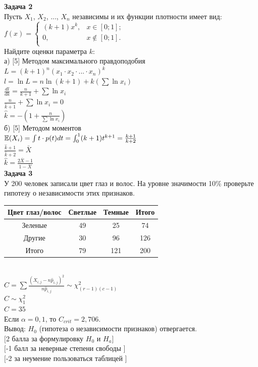 \documentclass[12pt, a4paper]{article}\usepackage[]{graphicx}\usepackage[]{color}
\begin{document}
{\bf Задача 2} \\
Пусть $X_{1}$, $X_{2}$, ..., $X_{n}$ независимы и их функции
плотности имеет вид: \\
$ f(x)=
\left\{%
\begin{array}{ll}
    (k+1)x^{k}, & x \in [0;1]; \\
    0, & x \notin [0;1]. \\
\end{array}%
\right.     $ \\
Найдите оценки параметра $k$: \\
а) [5] Методом максимального правдоподобия \\
$L=(k+1)^{n}(x_{1}\cdot x_{2} \cdot...\cdot x_{n})^{k}$ \\
$l=\ln{L}=n\ln(k+1)+k(\sum \ln{x_{i}})$ \\
$\frac{dl}{dk}=\frac{n}{k+1}+\sum \ln{x_{i}}$ \\
$\frac{n}{\hat{k}+1}+\sum \ln{x_{i}}=0$ \\
$\hat{k}=-\left(1+\frac{n}{\sum \ln{x_{i}}} \right)$ \\
б) [5] Методом моментов \\
$\mathbb{E}(X_{i})=\int t\cdot p(t)dt=\int_{0}^{1}
(k+1)t^{k+1}=\frac{k+1}{k+2}$ \\
$\frac{\hat{k}+1}{\hat{k}+2}=\bar{X}$ \\
$\hat{k}=\frac{2\bar{X}-1}{1-\bar{X}}$ \\


{\bf Задача 3} \\
У 200 человек записали цвет глаз и волос. На уровне значимости
10\% проверьте гипотезу о независимости этих признаков. \\
\begin{tabular}{|c|c|c|c|}
  \hline
  Цвет глаз/волос & Светлые & Темные & Итого \\
  \hline
  Зеленые & 49 & 25 & 74 \\
  Другие & 30 & 96 & 126 \\
  \hline
  Итого & 79 & 121 & 200 \\
  \hline
\end{tabular} \\
$C=\sum \frac{(X_{i,j}-n \hat{p}_{i,j})^{2}}{n\hat{p}_{i,j}}\sim
\chi_{(r-1)(c-1)}^{2}$ \\
$C\sim \chi_{1}^{2}$ \\
$C=35$ \\
Если $\alpha=0,1$, то $C_{crit}=2,706$. \\
Вывод: $H_{0}$ (гипотеза о независимости признаков) отвергается. \\
$[$2 балла за формулировку $H_{0}$ и $H_{a}]$ \\
$[$-1 балл за неверные степени свободы $]$ \\
$[$-2 за неумение пользоваться таблицей $]$ \\
\end{document}
